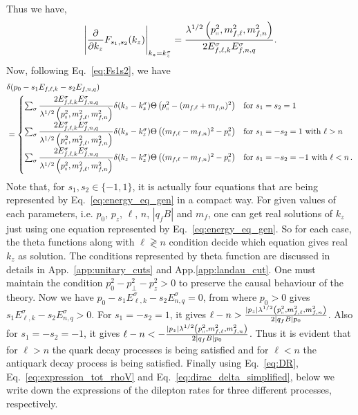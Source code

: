 \documentclass[aps,prd,floatfix,showpacs,showkeys,superscriptadress,unsortedaddress,nofootinbib,onecolumn]{revtex4-1}
\newcommand{\sF}{\scriptscriptstyle{f}}
\newcommand{\sperp}{\scriptscriptstyle{\perp}}
\newcommand{\shp}{\shortparallel}
\newcommand{\nn}{\nonumber \\}
\begin{document}
Thus we have,
\begin{align}
\Bigg\vert \frac{\partial}{\partial k_z}F_{s_1,s_2}(k_z)\Bigg\vert_{k_z=k^{\sigma}_z} = \frac{\lambda^{1/2}\left(p_{\shp}^2,m^2_{f,\ell},m^2_{f,n}\right)}{2E^{\sigma}_{f,\ell,k}E^{\sigma}_{f,n,q}}.
\end{align}
Now, following Eq.~\eqref{eq:Fs1s2}, we have
\begin{align}
&\delta(p_0-s_1E_{f,\ell,k}-s_2E_{f,n,q})  \nn
&=\begin{cases}
\sum_{\sigma} \dfrac{2E^{\sigma}_{f,\ell,k}E^{\sigma}_{f,n,q}}{\lambda^{1/2}\left(p_{\shp}^2,m^2_{f,\ell},m^2_{f,n}\right)}\delta(k_z-k_z^{\sigma})\Theta\left(p_{\shp}^2-(m_{f,\ell}+m_{f,n})^2\right) & \text{for  }s_1=s_2=1
\\
\sum_{\sigma} \dfrac{2E^{\sigma}_{f,\ell,k}E^{\sigma}_{f,n,q}}{\lambda^{1/2}\left(p_{\shp}^2,m^2_{f,\ell},m^2_{f,n}\right)}\delta(k_z-k_z^{\sigma})\Theta\left((m_{f,\ell}-m_{f,n})^2-p_{\shp}^2\right) &  \text{for  }s_1=-s_2=1 \text{ with } \ell > n \\
\sum_{\sigma} \dfrac{2E^{\sigma}_{f,\ell,k}E^{\sigma}_{f,n,q}}{\lambda^{1/2}\left(p_{\shp}^2,m^2_{f,\ell},m^2_{f,n}\right)}\delta(k_z-k_z^{\sigma})\Theta\left((m_{f,\ell}-m_{f,n})^2-p_{\shp}^2\right) &  \text{for  }s_1=-s_2=-1 \text{ with } \ell < n\,. \\
\end{cases} \label{eq:dirac_delta_simplified}
\end{align}
Note that, for $s_1,s_2\in \{-1,1\}$,  it is actually four equations that are being represented by Eq.~\eqref{eq:energy_eq_gen} in a compact way.  For given values of each parameters, i.e. $p_0$, $p_z$, $\ell$, $n$, $|q_{\sF}B|$ and $m_{\sF}$, one can get real solutions of $k_z$ just using one equation represented by Eq.~\eqref{eq:energy_eq_gen}.
So for each case, the theta functions along with $\ell\gtrless n$ condition decide which equation gives real $k_z$ as solution.  The conditions represented by theta function are discussed in details in App.~\eqref{app:unitary_cuts} and App.\eqref{app:landau_cut}. One must maintain the condition $p_0^2-p_{\sperp}^2-p_z^2>0$ to preserve the causal  behaviour of the theory. Now we have $p_0-s_1E_{\ell,k}^{\sigma}-s_2E_{n,q}^{\sigma}=0$, from where $p_0>0$ gives $s_1E_{\ell,k}^{\sigma}-s_2E_{n,q}^{\sigma}>0$. For $s_1=-s_2=1$,  it gives $\ell - n >\frac{|p_z|\lambda^{1/2}\left(p_{\shp}^2, m^2_{f,\ell},m^2_{f,n}\right)}{2|q_{\sF}B|p_0}$. Also for $s_1=-s_2=-1$, it gives $\ell - n <-\frac{|p_z|\lambda^{1/2}\left(p_{\shp}^2, m^2_{f,\ell},m^2_{f,n}\right)}{2|q_{\sF}B|p_0}$.  Thus it is evident that for $\ell>n$ the quark decay processes is being satisfied and for $\ell<n$ the antiquark decay process is being satisfied. 
Finally using Eq.~\eqref{eq:DR},  Eq.~\eqref{eq:expression_tot_rhoV} and Eq.~\eqref{eq:dirac_delta_simplified}, below we write down the expressions of the dilepton rates for three different processes, respectively.
\end{document}
